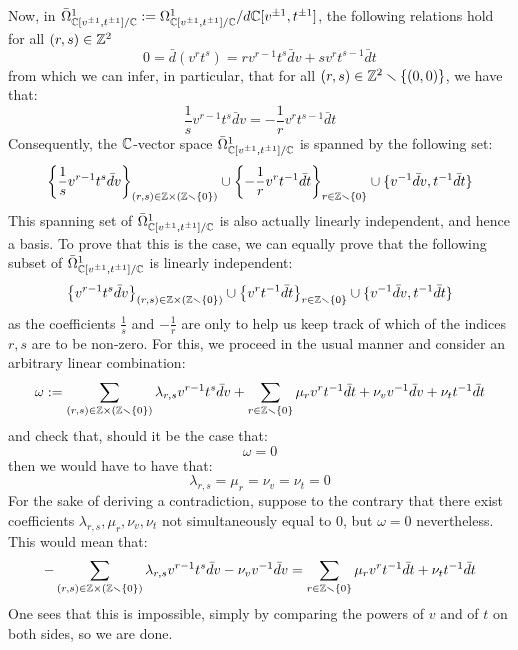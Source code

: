 \begin{example}
            Now, in $\bar{\Omega}^1_{\mathbb{C}[v^{\pm 1}, t^{\pm 1}]/\mathbb{C}} := \Omega^1_{\mathbb{C}[v^{\pm 1}, t^{\pm 1}]/\mathbb{C}}/d \mathbb{C}[v^{\pm 1}, t^{\pm 1}]$, the following relations hold for all $(r, s) \in \mathbb{Z}^2$
                $$0 = \bar{d}(v^r t^s) = r v^{r - 1} t^s \bar{d}v + s v^r t^{s - 1} \bar{d}t$$
            from which we can infer, in particular, that for all $(r, s) \in \mathbb{Z}^2 \smallsetminus \{(0, 0)\}$, we have that:
                $$\frac1s v^{r - 1} t^s \bar{d}v = -\frac1r v^r t^{s - 1} \bar{d}t$$
            Consequently, the $\mathbb{C}$-vector space $\bar{\Omega}^1_{\mathbb{C}[v^{\pm 1}, t^{\pm 1}]/\mathbb{C}}$ is spanned by the following set:
                $$\left\{ \frac1s v^{r - 1} t^s \bar{d}v \right\}_{(r, s) \in \Z \x (\Z \setminus \{0\})} \cup \left\{ -\frac1r v^r t^{-1} \bar{d}t \right\}_{r \in \Z \setminus \{0\}} \cup \{ v^{-1} \bar{d}v, t^{-1} \bar{d}t \}$$
            This spanning set of $\bar{\Omega}^1_{\mathbb{C}[v^{\pm 1}, t^{\pm 1}]/\mathbb{C}}$ is also actually linearly independent, and hence a basis. To prove that this is the case, we can equally prove that the following subset of $\bar{\Omega}^1_{\mathbb{C}[v^{\pm 1}, t^{\pm 1}]/\mathbb{C}}$ is linearly independent:
                $$\left\{ v^{r - 1} t^s \bar{d}v \right\}_{(r, s) \in \Z \x (\Z \setminus \{0\})} \cup \left\{ v^r t^{-1} \bar{d}t \right\}_{r \in \Z \setminus \{0\}} \cup \{ v^{-1} \bar{d}v, t^{-1} \bar{d}t \}$$
            as the coefficients $\frac1s$ and $-\frac1r$ are only to help us keep track of which of the indices $r, s$ are to be non-zero. For this, we proceed in the usual manner and consider an arbitrary linear combination:
                $$\omega := \sum_{(r, s) \in \Z \x (\Z \setminus \{0\})} \lambda_{r, s} v^{r - 1} t^s \bar{d}v + \sum_{r \in \Z \setminus \{0\}} \mu_r v^r t^{-1} \bar{d}t + \nu_v v^{-1} \bar{d}v + \nu_t t^{-1} \bar{d}t$$
            and check that, should it be the case that:
                $$\omega = 0$$
            then we would have to have that:
                $$\lambda_{r, s} = \mu_r = \nu_v = \nu_t = 0$$
            For the sake of deriving a contradiction, suppose to the contrary that there exist coefficients $\lambda_{r, s}, \mu_r, \nu_v, \nu_t$ not simultaneously equal to $0$, but $\omega = 0$ nevertheless. This would mean that:
                $$-\sum_{(r, s) \in \Z \x (\Z \setminus \{0\})} \lambda_{r, s} v^{r - 1} t^s \bar{d}v - \nu_v v^{-1} \bar{d}v = \sum_{r \in \Z \setminus \{0\}} \mu_r v^r t^{-1} \bar{d}t + \nu_t t^{-1} \bar{d}t$$
            One sees that this is impossible, simply by comparing the powers of $v$ and of $t$ on both sides, so we are done.
            

\end{example}

